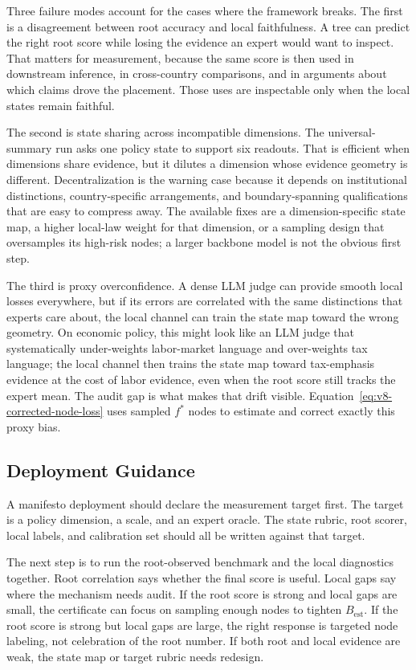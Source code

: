 Three failure modes account for the cases where the framework
breaks. The first is a disagreement between root accuracy and local
faithfulness. A tree can predict the right root score while losing
the evidence an expert would want to inspect. That matters for
measurement, because the same score is then used in downstream
inference, in cross-country comparisons, and in arguments about
which claims drove the placement. Those uses are inspectable only
when the local states remain faithful.

The second is state sharing across incompatible dimensions. The
universal-summary run asks one policy state to support six readouts.
That is efficient when dimensions share evidence, but it dilutes a
dimension whose evidence geometry is different. Decentralization is
the warning case because it depends on institutional distinctions,
country-specific arrangements, and boundary-spanning qualifications
that are easy to compress away. The available fixes are a
dimension-specific state map, a higher local-law weight for that
dimension, or a sampling design that oversamples its high-risk
nodes; a larger backbone model is not the obvious first step.

The third is proxy overconfidence. A dense LLM judge can provide
smooth local losses everywhere, but if its errors are correlated
with the same distinctions that experts care about, the local
channel can train the state map toward the wrong geometry. On
economic policy, this might look like an LLM judge that
systematically under-weights labor-market language and over-weights
tax language; the local channel then trains the state map toward
tax-emphasis evidence at the cost of labor evidence, even when the
root score still tracks the expert mean. The audit gap is what
makes that drift visible.
Equation~\eqref{eq:v8-corrected-node-loss} uses sampled \(f^\ast\)
nodes to estimate and correct exactly this proxy bias.

\subsection{Deployment Guidance}

A manifesto deployment should declare the measurement target first.
The target is a policy dimension, a scale, and an expert oracle. The
state rubric, root scorer, local labels, and calibration set should
all be written against that target.

The next step is to run the root-observed benchmark and the local diagnostics
together. Root correlation says whether the final score is useful. Local gaps
say where the mechanism needs audit. If the root score is strong and local
gaps are small, the certificate can focus on sampling enough nodes to tighten
\(B_{\mathrm{est}}\). If the root score is strong but local gaps are large,
the right response is targeted node labeling, not celebration of the root
number. If both root and local evidence are weak, the state map or target
rubric needs redesign.

